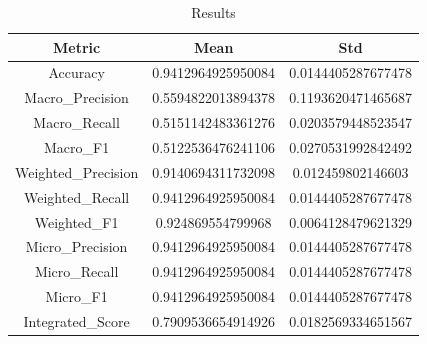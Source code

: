 \begin{table}[htbp]
\centering
\caption{Results}
\label{tab:csv}
\small
\setlength{\tabcolsep}{4pt}
\begin{tabular}{|c|c|c|}
\hline
Metric & Mean & Std \\
\hline
Accuracy & 0.9412964925950084 & 0.0144405287677478 \\
Macro_Precision & 0.5594822013894378 & 0.1193620471465687 \\
Macro_Recall & 0.5151142483361276 & 0.0203579448523547 \\
Macro_F1 & 0.5122536476241106 & 0.0270531992842492 \\
Weighted_Precision & 0.9140694311732098 & 0.012459802146603 \\
Weighted_Recall & 0.9412964925950084 & 0.0144405287677478 \\
Weighted_F1 & 0.924869554799968 & 0.0064128479621329 \\
Micro_Precision & 0.9412964925950084 & 0.0144405287677478 \\
Micro_Recall & 0.9412964925950084 & 0.0144405287677478 \\
Micro_F1 & 0.9412964925950084 & 0.0144405287677478 \\
Integrated_Score & 0.7909536654914926 & 0.0182569334651567 \\
\hline
\end{tabular}
\end{table}